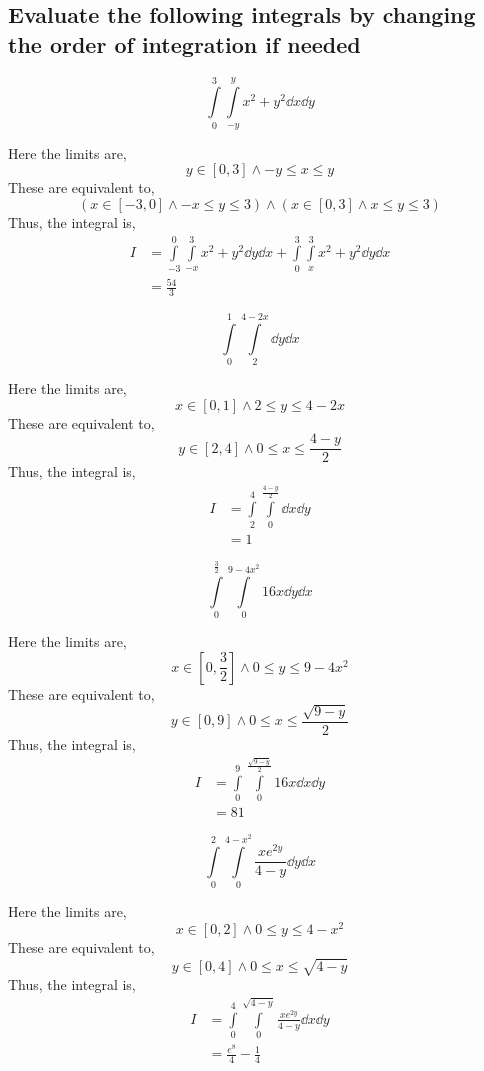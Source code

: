 \subsection{Evaluate the following integrals by changing the order of integration if needed}
\begin{asign}
	\[\int\limits_0^3\int\limits_{-y}^yx^2+y^2\dd{x}\dd{y}\]
\end{asign}
\begin{anse}
	Here the limits are,
	\[y\in[0,3]\land -y\leq x\leq y\]
	These are equivalent to,
	\[\left(x\in[-3,0]\land -x\leq y\leq 3\right)\land \left(x\in[0,3]\land x\leq y\leq 3\right)\]
	Thus, the integral is,
	\[\begin{split}
		I&=\int\limits_{-3}^0\int\limits_{-x}^3x^2+y^2\dd{y}\dd{x}+\int\limits_{0}^3\int\limits_{x}^3x^2+y^2\dd{y}\dd{x}\\
		&=\frac{54}{3}
	\end{split}\]
\end{anse}
\begin{asign}
	\[\int\limits_0^1\int\limits_2^{4-2x}\dd{y}\dd{x}\]
\end{asign}
\begin{anse}
	Here the limits are,
	\[x\in[0,1]\land 2\leq y\leq 4-2x\]
	These are equivalent to,
	\[y\in[2,4]\land 0\leq x\leq \frac{4-y}{2}\]
	Thus, the integral is,
	\[\begin{split}
		I&=\int\limits_2^4\int\limits_0^{\frac{4-y}{2}}\dd{x}\dd{y}\\
		&=1
	\end{split}\]
\end{anse}
\begin{asign}
	\[\int\limits_0^\frac{3}{2}\int\limits_0^{9-4x^2}16x\dd{y}\dd{x}\]
\end{asign}
\begin{anse}
	Here the limits are,
	\[x\in[0,\frac{3}{2}]\land 0\leq y\leq 9-4x^2\]
	These are equivalent to,
	\[y\in[0,9]\land 0\leq x\leq \frac{\sqrt{9-y}}{2}\]
	Thus, the integral is,
	\[\begin{split}
		I&=\int\limits_0^9\int\limits_0^{\frac{\sqrt{9-y}}{2}}16x\dd{x}\dd{y}\\
		&=81
	\end{split}\]
\end{anse}
\begin{asign}
	\[\int\limits_0^2\int\limits_0^{4-x^2}\frac{xe^{2y}}{4-y}\dd{y}\dd{x}\]
\end{asign}
\begin{anse}
	Here the limits are,
	\[x\in[0,2]\land 0\leq y\leq 4-x^2\]
	These are equivalent to,
	\[y\in[0,4]\land 0\leq x\leq \sqrt{4-y}\]
	Thus, the integral is,
	\[\begin{split}
		I&=\int\limits_0^4\int\limits_0^{\sqrt{4-y}}\frac{xe^{2y}}{4-y}\dd{x}\dd{y}\\
		&=\frac{e^8}{4}-\frac{1}{4}
	\end{split}\]
\end{anse}
